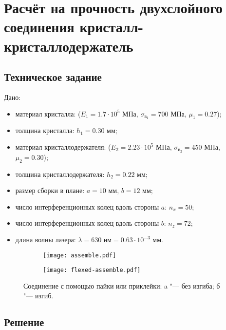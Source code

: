 \chapter{Расчёт на прочность двухслойного соединения кристалл-кристаллодержатель}

\section{Техническое задание}

Дано:
\begin{itemize}
    \item материал кристалла:
         ($E_1 = 1.7 \cdot 10^5 \text{ МПа}$, $\sigma_{в_1} = 700 \text{ МПа}$, $\mu_1 = 0.27$);
    \item толщина кристалла:
        $h_1 = 0.30 \text{ мм}$;
    \item материал кристаллодержателя:
         ($E_2 = 2.23 \cdot 10^5 \text{ МПа}$, $\sigma_{в_2} = 450 \text{ МПа}$, $\mu_2 = 0.30$);
    \item толщина кристаллодержателя:
        $h_2 = 0.22 \text{ мм}$;
    \item размер сборки в плане:
        $a = 10 \text{ мм}$, $b = 12 \text{ мм}$;
    \item число интерференционных колец вдоль стороны $a$:
        $n_x = 50$;
    \item число интерференционных колец вдоль стороны $b$:
        $n_z = 72$;
    \item длина волны лазера:
        $\lambda = 630 \text{ нм} = 0.63 \cdot 10^{-3} \text{ мм}$.
\end{itemize}

\begin{figure}[!ht]
    \centering
    \begin{subfigure}[b]{0.45\textwidth}
        \centering
        \texttt{[image: assemble.pdf]}
        \caption{}
        \label{fig:assemble}
    \end{subfigure}
    \begin{subfigure}[b]{0.45\textwidth}
        \centering
        \texttt{[image: flexed-assemble.pdf]}
        \caption{}
        \label{fig:flexed-assemble}
    \end{subfigure}
    \caption{Соединение с помощью пайки или приклейки:
    a "--- без изгиба;
    б "--- изгиб.
    }
    \label{fig:assembles}
\end{figure}

\section{Решение}

